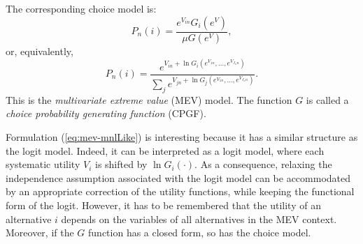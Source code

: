 \documentclass[12pt,a4paper]{article}
\newcommand{\req}[1]{(\ref{#1})}
\begin{document}
The corresponding choice model is:
\begin{equation}
  \label{eq:mev-orig}
P_n(i)=\frac{e^{V_{in}}G_i(e^V)}{\mu G(e^V)},
\end{equation}
or, equivalently,
\begin{equation}
\label{eq:mev-mnlLike}
P_n(i) = \frac{e^{V_{in} + \ln G_i\left(e^{V_{1n}},\ldots,e^{V_{J_n n}}\right)}}{\sum_j e^{V_{jn} + \ln G_j\left(e^{V_{1n}},\ldots,e^{V_{J_n n}}\right)}}.
\end{equation}
This is the \emph{multivariate extreme value} (MEV) model.  The function $G$
is called a \emph{choice probability generating function} (CPGF).

Formulation \req{eq:mev-mnlLike} is interesting because it has a
similar structure as the logit model. Indeed, it can be interpreted as
a logit model, where each systematic utility $V_i$ is shifted by  $
\ln G_i(\cdot)$. As a consequence, relaxing the independence
assumption associated with  the logit model can be accommodated by an
appropriate correction of the utility functions, while keeping the
functional form of the logit. However, it has to be remembered that the utility of an alternative $i$ depends on the variables of all alternatives in the MEV context. Moreover, if the $G$ function has a closed form, so has the choice model. 
\end{document}
